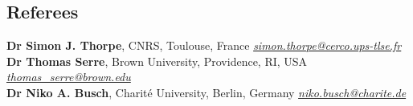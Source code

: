 \documentclass[margin,line]{resume}
\begin{document}
\begin{resume}
	\section{\mysidestyle Referees} 

	\textbf{Dr Simon J. Thorpe}, CNRS, Toulouse, France  \hfill \textsl{\href{mailto:simon.thorpe@cerco.ups-tlse.fr}{simon.thorpe@cerco.ups-tlse.fr}}\\
	\textbf{Dr Thomas Serre}, Brown University, Providence, RI, USA \hfill \textsl{\href{mailto:thomas_serre@brown.edu}{thomas\_serre@brown.edu}} \\
	\textbf{Dr Niko A. Busch}, Charité University, Berlin, Germany \hfill \textsl{\href{mailto:niko.busch@charite.de}{niko.busch@charite.de}} \\

\end{resume}
\end{document}
